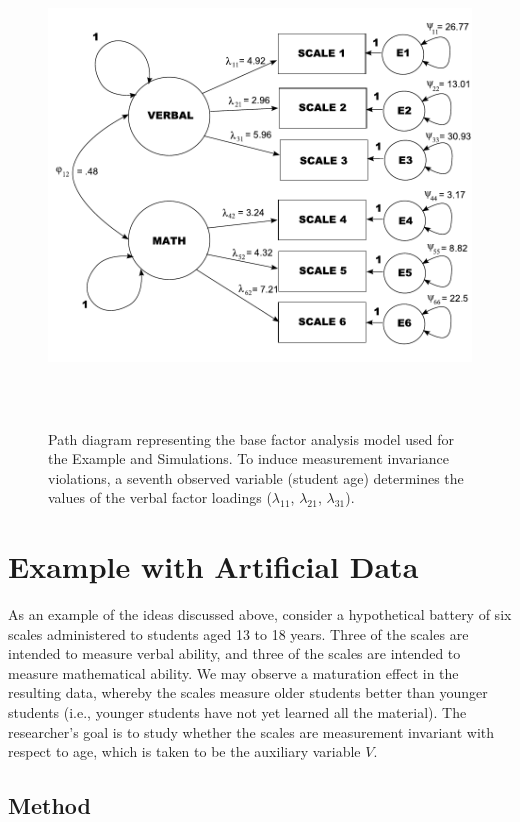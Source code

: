 \documentclass[man]{apa}
\begin{document}
\begin{figure}
\caption{Path diagram representing the base factor analysis model used for
  the Example and Simulations.  To induce measurement invariance
  violations, a seventh observed variable (student age) determines the
values of the verbal factor loadings ($\lambda_{11}$, $\lambda_{21}$,
$\lambda_{31}$).}
\label{fig:famod}
\includegraphics[height=5in]{famod.pdf}
%
\end{figure}


\section{Example with Artificial Data}

As an example of the ideas discussed above, consider a
hypothetical battery of six scales administered to students aged 13 to 18
years.  Three of the scales are intended to measure verbal ability, and
three of the scales are intended to measure mathematical ability.  We
may observe a maturation effect in the resulting data, whereby the scales
measure older students better than younger students (i.e., younger
students have not yet learned all the material).  The researcher's goal is to
study whether the scales are measurement invariant with
respect to age, which is taken to be the auxiliary variable $V$.

\subsection{Method}
\end{document}
